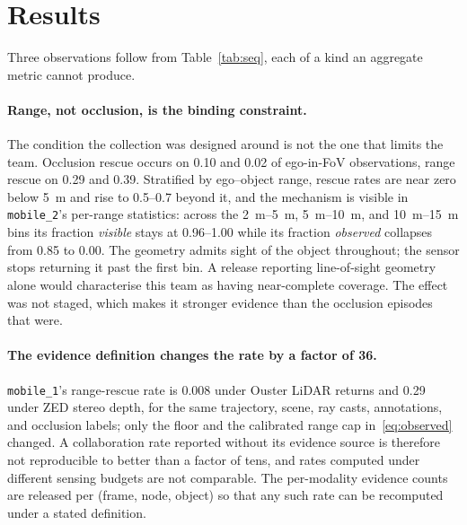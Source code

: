 \section{Results}
\label{sec:findings}

Three observations follow from Table~\ref{tab:seq}, each of a kind an aggregate
metric cannot produce.

\paragraph{Range, not occlusion, is the binding constraint.}
The condition the collection was designed around is not the one that limits the
team. Occlusion rescue occurs on 0.10 and 0.02 of ego-in-FoV observations,
range rescue on 0.29 and 0.39. Stratified by ego--object range, rescue rates are
near zero below \SI{5}{\metre} and rise to \numrange{0.5}{0.7} beyond it, and
the mechanism is visible in \texttt{mobile\_2}'s per-range statistics: across
the \SIrange{2}{5}{\metre}, \SIrange{5}{10}{\metre}, and
\SIrange{10}{15}{\metre} bins its fraction \textit{visible} stays at
\numrange{0.96}{1.00} while its fraction \textit{observed} collapses from
\num{0.85} to \num{0.00}. The geometry admits sight of the object throughout;
the sensor stops returning it past the first bin. A release reporting
line-of-sight geometry alone would characterise this team as having
near-complete coverage. The effect was not staged, which makes it stronger
evidence than the occlusion episodes that were.

\paragraph{The evidence definition changes the rate by a factor of 36.}
\texttt{mobile\_1}'s range-rescue rate is \num{0.008} under Ouster LiDAR returns
and \num{0.29} under ZED stereo depth, for the same trajectory, scene, ray
casts, annotations, and occlusion labels; only the floor and the calibrated
range cap in~\eqref{eq:observed} changed. A collaboration rate reported without
its evidence source is therefore not reproducible to better than a factor of
tens, and rates computed under different sensing budgets are not comparable.
The per-modality evidence counts are released per (frame, node, object) so that
any such rate can be recomputed under a stated definition.

